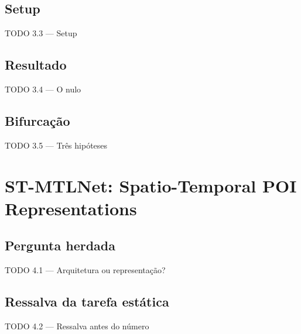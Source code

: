 \documentclass{beamer}
\begin{document}
\subsection{Setup}
\begin{frame}{TODO 3.3 --- Setup}
\end{frame}

\subsection{Resultado}
\begin{frame}{TODO 3.4 --- O nulo}
\end{frame}

\subsection{Bifurcação}
\begin{frame}{TODO 3.5 --- Três hipóteses}
\end{frame}


\section[ST-MTLNet]{ST-MTLNet: Spatio-Temporal POI Representations}               %

\subsection{Pergunta herdada}
\begin{frame}{TODO 4.1 --- Arquitetura ou representação?}
\end{frame}

\subsection{Ressalva da tarefa estática}
\begin{frame}{TODO 4.2 --- Ressalva antes do número}
\end{frame}
\end{document}
